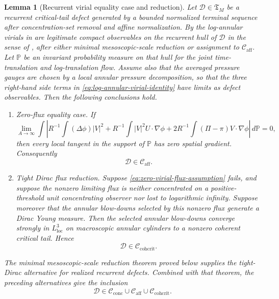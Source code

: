 \documentclass[11pt]{amsart}
\numberwithin{equation}{section}
\theoremstyle{plain}
\newtheorem{lemma}[lemma]{Lemma}
\theoremstyle{definition}
\theoremstyle{remark}
\newcommand{\loc}{\mathrm{loc}}
\newcommand{\Cactive}{\mathcal C_{\mathrm{conc}}}
\newcommand{\Caff}{\mathcal C_{\mathrm{aff}}}
\newcommand{\Ccohcrit}{\mathcal C_{\mathrm{cohcrit}}}
\newcommand{\Tcrit}{\mathfrak T_M}
\begin{document}
\begin{lemma}[Recurrent virial equality case and reduction]
\label{lem:recurrent-virial-equality-reduction}
Let \(\mathcal D\in\Tcrit\) be a recurrent critical-tail defect generated by a
bounded normalized terminal sequence after concentration-set removal and affine
normalization.  By  the
log-annular virials in  are
legitimate compact observables on the recurrent hull of \(\mathcal D\) in the
sense of , after either minimal
mesoscopic-scale reduction or assignment to \(\Caff\).  Let \(\mathbb P\) be an
invariant probability measure on that hull for the joint time-translation and
log-translation flow.  Assume also that the averaged pressure gauges are chosen
by a local annular pressure decomposition, so that the three right-hand side
terms in \eqref{eq:log-annular-virial-identity} have limits as defect
observables.  Then the following conclusions hold.

\begin{enumerate}[label=\textup{(\roman*)}]
   \item \emph{Zero-flux equality case.}  If
   \begin{equation}
   \label{eq:zero-virial-flux-assumption}
      \lim_{A\to\infty}
      \int
      \left|
         R^{-1}\int (\Delta\phi)|V|^2
         +R^{-1}\int |V|^2U\cdot\nabla\phi
         +2R^{-1}\int(\Pi-\pi)V\cdot\nabla\phi
      \right|\,d\mathbb P=0,
   \end{equation}
   then every local tangent in the support of \(\mathbb P\) has zero spatial
   gradient.  Consequently
   \[
      \mathcal D\in\Caff .
   \]
   \item \emph{Tight Dirac flux reduction.}  Suppose
   \eqref{eq:zero-virial-flux-assumption} fails, and suppose the nonzero
   limiting flux is neither concentrated on a positive-threshold unit concentrating
   observer nor lost to logarithmic infinity.  Suppose moreover that the
   annular blow-downs selected by this nonzero flux generate a Dirac Young
   measure.  Then the selected annular blow-downs converge strongly in
   \(L^3_{\loc}\) on macroscopic annular cylinders to a nonzero coherent
   critical tail.  Hence
   \[
      \mathcal D\in\Ccohcrit .
   \]
\end{enumerate}
The minimal mesoscopic-scale reduction theorem proved below supplies the tight-Dirac
alternative for realized recurrent defects.  Combined with that theorem, the
preceding alternatives give the inclusion
\[
   \mathcal D\in\Cactive\cup\Caff\cup\Ccohcrit .
\]
\end{lemma}
\end{document}
